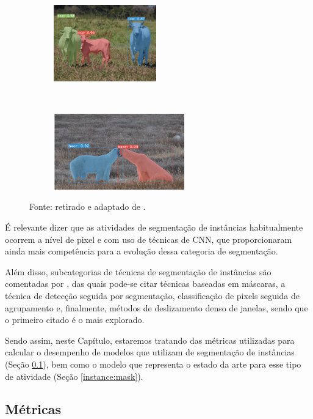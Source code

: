 \begin{figure}[H]
    \begin{subfigure}[t]{0.45\textwidth}
        \centering
        \includegraphics[height=1.3in]{recursos/imagens/instance/ins2.png}
        \label{instance:fig:4.3}
    \end{subfigure}
    ~
    \begin{subfigure}[t]{0.45\textwidth}
        \centering
        \includegraphics[height=1.3in]{recursos/imagens/instance/ins4.png}
        \label{instance:fig:4.4}
    \end{subfigure}

    Fonte: retirado e adaptado de \cite{Bolya2019}.
\end{figure}

É relevante dizer que as atividades de segmentação de instâncias habitualmente ocorrem a nível de pixel e com uso de técnicas de CNN, que proporcionaram ainda mais competência para a evolução dessa categoria de segmentação.

Além disso, subcategorias de técnicas de segmentação de instâncias são comentadas por \cite{Hafiz2020}, das quais pode-se citar técnicas baseadas em máscaras, a técnica de detecção seguida por segmentação, classificação de pixels seguida de agrupamento e, finalmente, métodos de deslizamento denso de janelas, sendo que o primeiro citado é o mais explorado.

Sendo assim, neste Capítulo, estaremos tratando das métricas utilizadas para calcular o desempenho de modelos que utilizam de segmentação de instâncias (Seção \ref{instance:metrics}), bem como o modelo que representa o estado da arte para esse tipo de atividade (Seção \ref{instance:mask}).


\subsection{Métricas}
\label{instance:metrics}

